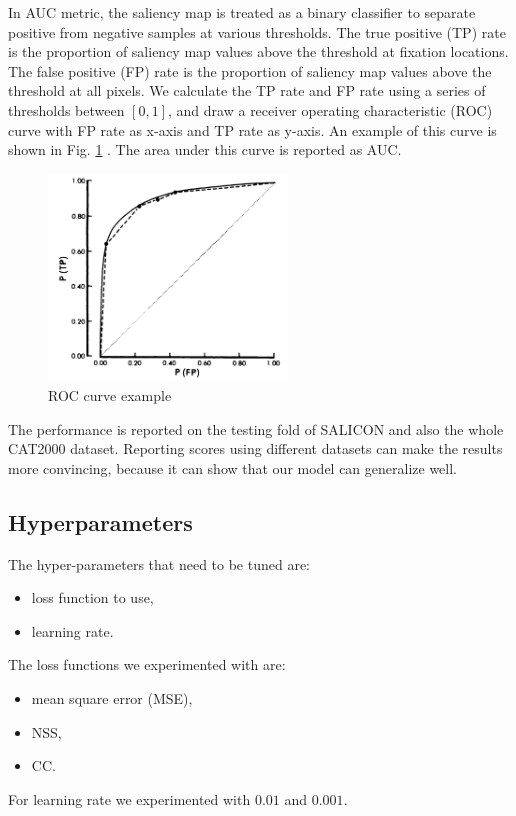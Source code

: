 \documentclass[12pt]{article}
\begin{document}
In AUC metric,
the saliency map is treated as a binary classifier to separate positive from negative samples at various thresholds. 
The true positive (TP) rate is the proportion of saliency map values above the threshold at fixation locations.
The false positive (FP) rate is the proportion of saliency map values above the threshold at all pixels.
We calculate the TP rate and FP rate using a series of thresholds between $[0, 1]$, and draw a
receiver operating characteristic (ROC) curve with FP rate as x-axis and TP rate as y-axis.
An example of this curve is shown in Fig. \ref{img:AUC} \cite{hanleyMeaningUseArea1982}.
The area under this curve is reported as AUC.

\begin{figure}[!h]
    \centering
    \includegraphics[width=2.5in]{imgs/AUC.png}
    \caption{ROC curve example\cite{hanleyMeaningUseArea1982}}
    \label{img:AUC}
\end{figure}


The performance is reported on the testing fold of SALICON and also the whole CAT2000 dataset.
Reporting scores using different datasets can make the results more convincing,
because it can show that our model can generalize well.

\subsection{Hyperparameters}
The hyper-parameters that need to be tuned are:
\begin{itemize}
    \item loss function to use,
    \item learning rate.
\end{itemize}

The loss functions we experimented with are:
\begin{itemize}
    \item mean square error (MSE),
    \item NSS,
    \item CC.
\end{itemize}
For learning rate we experimented with $0.01$ and $0.001$.
\end{document}

